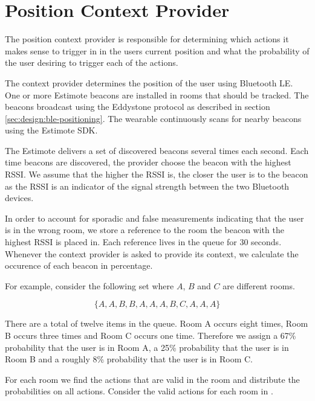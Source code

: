 \section{Position Context Provider}
\label{sec:design:position-context-provider}

The position context provider is responsible for determining which actions it makes sense to trigger in in the users current position and what the probability of the user desiring to trigger each of the actions.

The context provider determines the position of the user using Bluetooth LE. One or more Estimote beacons are installed in rooms that should be tracked. The beacons broadcast using the Eddystone protocol as described in section \ref{sec:design:ble-positioning}. The wearable continuously scans for nearby beacons using the Estimote SDK.

The Estimote delivers a set of discovered beacons several times each second. Each time beacons are discovered, the provider choose the beacon with the highest RSSI. We assume that the higher the RSSI is, the closer the user is to the beacon as the RSSI is an indicator of the signal strength between the two Bluetooth devices.

In order to account for sporadic and false measurements indicating that the user is in the wrong room, we store a reference to the room the beacon with the highest RSSI is placed in. Each reference lives in the queue for 30 seconds.  Whenever the context provider is asked to provide its context, we calculate the occurence of each beacon in percentage.

For example, consider the following set where $A$, $B$ and $C$ are different rooms.

\begin{equation*}
  \{ A, A, B, B, A, A, A, B, C, A, A, A \}
\end{equation*}

There are a total of twelve items in the queue. Room A occurs eight times, Room B occurs three times and Room C occurs one time. Therefore we assign a 67\% probability that the user is in Room A, a 25\% probability that the user is in Room B and a roughly 8\% probability that the user is in Room C.

For each room we find the actions that are valid in the room and distribute the probabilities on all actions. Consider the valid actions for each room in .

